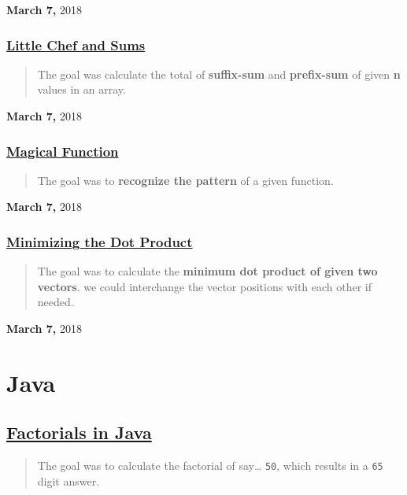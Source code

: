 \documentclass[11pt]{article}
\begin{document}
\textbf{March 7,} 2018

\subsubsection{\href{https://imahajanshubham.github.io/docs/lang/c-c++/only\_source\_code/little\_chefnsums.html}{Little Chef and Sums}}
\label{sec:org2a252ac}
\begin{quote}
The goal was calculate the total of \textbf{suffix-sum} and \textbf{prefix-sum} of given \textbf{n} values
in an array.
\end{quote}

\textbf{March 7,} 2018

\subsubsection{\href{https://imahajanshubham.github.io/docs/lang/c-c++/only\_source\_code/magical\_function.html}{Magical Function}}
\label{sec:org5c8c1de}
\begin{quote}
The goal was to \textbf{recognize the pattern} of a given function.
\end{quote}

\textbf{March 7,} 2018

\subsubsection{\href{https://imahajanshubham.github.io/docs/lang/c-c++/only\_source\_code/minimizing\_the\_dotproduct.html}{Minimizing the Dot Product}}
\label{sec:org356758f}
\begin{quote}
The goal was to calculate the \textbf{minimum dot product of given two vectors}. we could
interchange the vector positions with each other if needed. 
\end{quote}

\textbf{March 7,} 2018

\section{Java}
\label{sec:org7fd077a}
\subsection{\href{https://imahajanshubham.github.io/docs/lang/java/factorial.html}{Factorials in Java}}
\label{sec:org4e91cf9}
\begin{quote}
The goal was to calculate the factorial of say… \texttt{50}, which results in a \texttt{65}
digit answer.
\end{quote}
\end{document}
